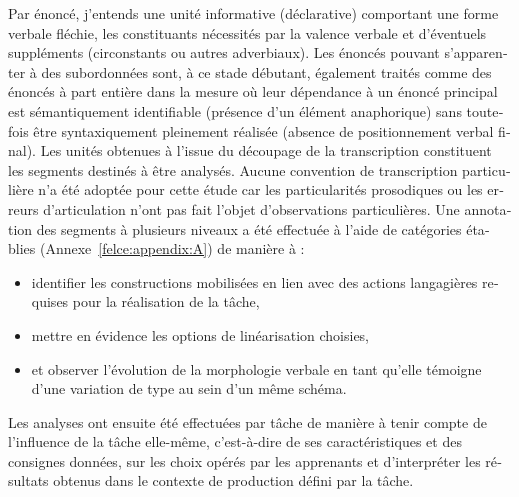 \documentclass[output=paper]{langscibook}
\begin{document}
\begin{otherlanguage}{french}
\hspace*{-3.8pt}Par énoncé, j'entends une unité informative (déclarative) comportant une forme verbale fléchie, les constituants nécessités par la valence verbale et d’éventuels suppléments (circonstants ou autres adverbiaux). Les énoncés pouvant s’apparenter à des subordonnées sont, à ce stade débutant, également traités comme des énoncés à part entière dans la mesure où leur dépendance à un énoncé principal est sémantiquement identifiable (présence d’un élément anaphorique) sans toutefois être syntaxiquement pleinement réalisée (absence de positionnement verbal final). Les unités obtenues à l’issue du découpage de la transcription constituent les segments destinés à être analysés. Aucune convention de transcription particulière n'a été adoptée pour cette étude car les particularités prosodiques ou les erreurs d’articulation n’ont pas fait l’objet d’observations particulières. Une annotation des segments à plusieurs niveaux a été effectuée à l’aide de catégories établies (Annexe~\ref{felce:appendix:A}) de manière à :

\begin{itemize}
\item identifier les constructions mobilisées en lien avec des actions langagières requises pour la réalisation de la tâche,
\item mettre en évidence les options de linéarisation choisies,
\item et observer l’évolution de la morphologie verbale en tant qu’elle témoigne d’une variation de type au sein d’un même schéma.
\end{itemize}


%   

Les analyses ont ensuite été effectuées par tâche de manière à tenir compte de l’influence de la tâche elle-même, c’est-à-dire de ses caractéristiques et des consignes données, sur les choix opérés par les apprenants et d’interpréter les résultats obtenus dans le contexte de production défini par la tâche.


\end{otherlanguage}
\end{document}
